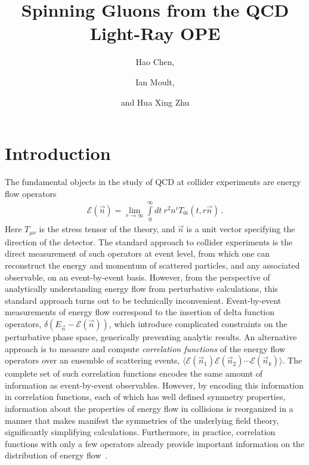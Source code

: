 \documentclass[letterpaper,11pt]{article}
\title{Spinning Gluons from the QCD Light-Ray OPE}
\author[1]{Hao Chen,}
\author[2]{Ian Moult,}
\author[1]{and Hua Xing Zhu}
\affiliation[1]{Zhejiang Institute of Modern Physics, Department of Physics, Zhejiang University, Hangzhou, Zhejiang 310027, China}
\affiliation[2]{SLAC National Accelerator Laboratory, Stanford University, CA, 94309, USA\vspace{0.5ex}}
\begin{document}
 

\maketitle

\newpage

\section{Introduction}


The fundamental objects in the study of QCD at collider experiments are energy flow operators \cite{Sveshnikov:1995vi,Tkachov:1995kk,Korchemsky:1999kt,Bauer:2008dt,Hofman:2008ar,Belitsky:2013xxa,Belitsky:2013bja,Kravchuk:2018htv}
\begin{align}\label{eq:ANEC_op}
\mathcal{E}(\vec n) = \lim_{r\to \infty}  \int\limits_0^\infty dt~ r^2 n^i T_{0i}(t,r \vec n)\,.
\end{align}
Here $T_{\mu \nu}$ is the stress tensor of the theory, and $\vec n$ is a unit vector specifying the direction of the detector. The standard approach to collider experiments is the direct measurement of such operators at event level, from which one can reconstruct the energy and momentum of scattered particles, and any associated observable, on an event-by-event basis. However, from the perspective of analytically understanding energy flow from perturbative calculations, this standard approach turns out to be technically inconvenient. Event-by-event measurements of energy flow correspond to the insertion of delta function operators, $\delta(E_{\vec n} - \mathcal{E}(\vec n))$, which introduce complicated constraints on the perturbative phase space, generically preventing analytic results.  An alternative approach is to measure and compute \emph{correlation functions} of the energy flow operators over an ensemble of scattering events, $\langle \mathcal{E}(\vec n_1) \mathcal{E}(\vec n_2) \cdots \mathcal{E}(\vec n_k) \rangle$. The complete set of such correlation functions encodes the same amount of information as event-by-event observables. However, by encoding this information in correlation functions, each of which has well defined symmetry properties, information about the properties of energy flow in collisions is reorganized in a manner that makes manifest the symmetries of the underlying field theory, significantly simplifying calculations. Furthermore, in practice, correlation functions with only a few operators already provide important information on the distribution of energy flow~\cite{Chen:2020vvp}.
\end{document}
